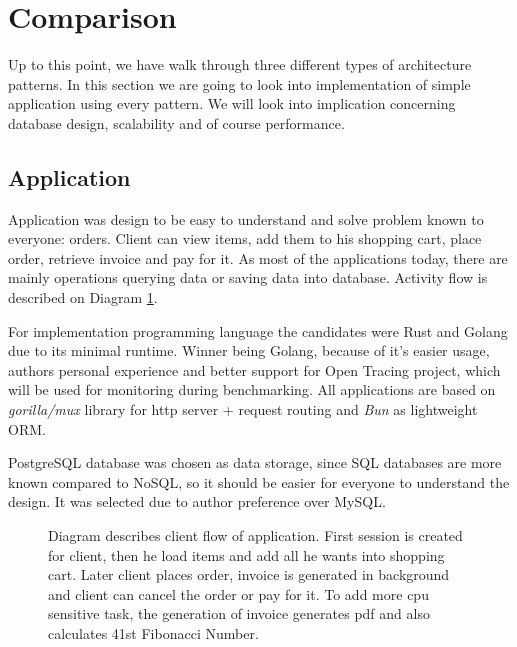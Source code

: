 

\section{Comparison}
Up to this point, we have walk through three different types of architecture patterns. In this section we are going to look into implementation of simple application using every pattern. We will look into implication concerning database design, scalability and of course performance.

\subsection{Application}
Application was design to be easy to understand and solve problem known to everyone: orders. Client can view items, add them to his shopping cart, place order, retrieve invoice and pay for it. As most of the applications today, there are mainly operations querying data or saving data into database. Activity flow is described on Diagram \ref{img:app_activity_flow}.

For implementation programming language the candidates were Rust and Golang due to its minimal runtime. Winner being Golang, because of it's easier usage, authors personal experience and better support for Open Tracing project, which will be used for monitoring during benchmarking. All applications are based on \textit{gorilla/mux} \cite{MUX} library for http server + request routing and \textit{Bun} \cite{BUN} as lightweight ORM.

PostgreSQL database was chosen as data storage, since SQL databases are more known compared to NoSQL, so it should be easier for everyone to understand the design. It was selected due to author preference over MySQL.
\begin{figure}
    \centering
    
    \caption{Diagram describes client flow of application. First session is created for client, then he load items and add all he wants into shopping cart. Later client places order, invoice is generated in background and client can cancel the order or pay for it. To add more cpu sensitive task, the generation of invoice generates pdf and also calculates 41st Fibonacci Number. \label{img:app_activity_flow}}
\end{figure}


